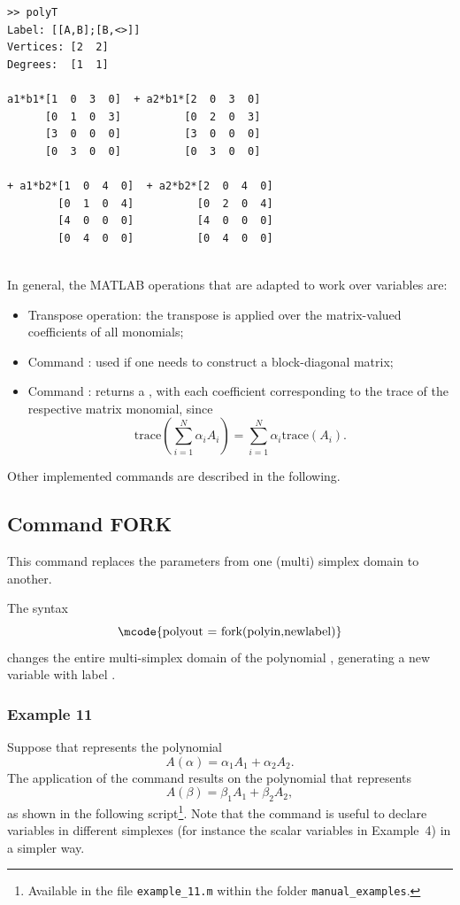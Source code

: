 \documentclass[english,11pt]{article}
\theoremstyle{break} \theorembodyfont{\small\rm}
\begin{document}
\begin{minipage}{10.5cm}
\begin{lstlisting}[rulecolor=\color{red}]
>> polyT
Label: [[A,B];[B,<>]]
Vertices: [2  2]
Degrees:  [1  1]
 
a1*b1*[1  0  3  0]  + a2*b1*[2  0  3  0]   
      [0  1  0  3]          [0  2  0  3]   
      [3  0  0  0]          [3  0  0  0]   
      [0  3  0  0]          [0  3  0  0]    
      
+ a1*b2*[1  0  4  0]  + a2*b2*[2  0  4  0]      
        [0  1  0  4]          [0  2  0  4]      
        [4  0  0  0]          [4  0  0  0]      
        [0  4  0  0]          [0  4  0  0]      
      
\end{lstlisting}
\end{minipage}



In general, the MATLAB operations that are adapted to work over  variables are:

\begin{itemize}
 \item Transpose operation: the transpose is applied over the matrix-valued coefficients of all monomials;
 
 \item Command : used if one needs to construct a  block-diagonal matrix;
 
 \item Command : returns a , with each coefficient corresponding to the trace of
 the respective matrix monomial, since 
 \[
 \displaystyle \mbox{trace}\left(\sum_{i=1}^N \alpha_i A_i\right) = \sum_{i=1}^N \alpha_i \mbox{trace}(A_i).
 \]
\end{itemize}

Other implemented commands are described in the following.

\subsection*{Command FORK}

This command replaces the parameters from one (multi) simplex domain to another.

The syntax
\[
\mbox{\mcode{polyout = fork(polyin,newlabel)}}
\]
changes the entire multi-simplex domain of the polynomial , generating a 
new variable with label .

\subsubsection*{Example 11}
Suppose that  represents the polynomial
\[
 A(\alpha) = \alpha_1 A_1 + \alpha_2 A_2.
\]
The application of the command  results on the polynomial 
that represents
\[
 A(\beta) = \beta_1 A_1 + \beta_2 A_2,
\]
as shown in the following script\footnote{Available in the file \texttt{example\_11.m} within the folder \texttt{manual\_examples}.}. Note
that the  command is useful to declare variables in different simplexes (for instance the scalar variables in Example~4)
in a simpler way.
\end{document}
